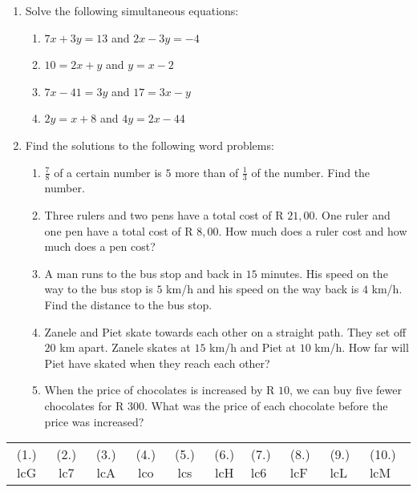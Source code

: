 \begin{eocexercises}{}
\begin{enumerate}[itemsep=5pt, label=\textbf{\arabic*}. ]
\item Solve the following simultaneous equations:
\begin{enumerate}[itemsep=5pt,label=\textbf{(\alph*)}]
\item $7x+3y=13$ and $2x-3y=-4$  
\item $10=2x+y$ and $y=x-2$
\item $7x-41=3y$ and $17=3x-y$
\item $2y=x+8$ and $4y=2x-44$
\end{enumerate}

\item Find the solutions to the following word problems:
\begin{enumerate}[itemsep=5pt,label=\textbf{(\alph*)}]
\item $\frac{7}{8}$ of a certain number is $5$ more than of $\frac{1}{3}$ of the number. Find the number.
\item Three rulers and two pens have a total cost of R $21,00$. One ruler and one pen have a total cost of R $8,00$. How much does a ruler cost and how much does a pen cost? 
\item A man runs to the bus stop and back in $15$ minutes. His speed on the way to the bus stop is $5$ km/h and his speed on the way back is $4$ km/h. Find the distance to the bus stop.
\item Zanele and Piet skate towards each other on a straight path. They set off $20$ km apart. Zanele skates at $15$ km/h and Piet at $10$ km/h. How far will Piet have skated when they reach each other?
\item When the price of chocolates is increased by R $10$, we can buy five fewer chocolates for R $300$. What was the price of each chocolate before the price was increased?
   

\end{enumerate}
\end{enumerate}
\practiceinfo
\par 
\par \begin{tabular}[h]{cccccc}
(1.) lcG  &  (2.) lc7  &  (3.) lcA  &  (4.) lco  &  (5.) lcs  &  (6.) lcH  &  (7.) lc6  &  (8.) lcF  &  (9.) lcL  &  (10.) lcM  & \end{tabular}

\end{eocexercises}
